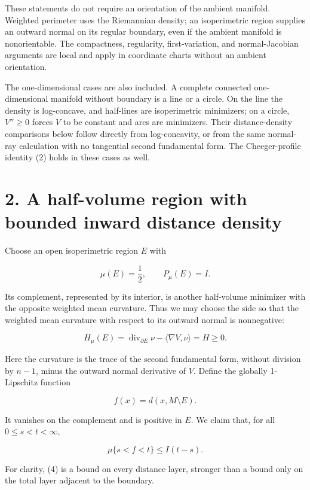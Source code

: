 \documentclass[11pt,a4paper]{article}
\begin{document}
These statements do not require an orientation of the ambient manifold.
Weighted perimeter uses the Riemannian density; an isoperimetric region
supplies an outward normal on its regular boundary, even if the ambient
manifold is nonorientable. The compactness, regularity, first-variation,
and normal-Jacobian arguments are local and apply in coordinate charts
without an ambient orientation.

The one-dimensional cases are also included. A complete connected
one-dimensional manifold without boundary is a line or a circle. On the
line the density is log-concave, and half-lines are isoperimetric
minimizers; on a circle, \(V''\geq0\) forces \(V\) to be constant and
arcs are minimizers. Their distance-density comparisons below follow
directly from log-concavity, or from the same normal-ray calculation
with no tangential second fundamental form. The Cheeger-profile identity
(2) holds in these cases as well.

\hypertarget{1013-a-half-volume-region-with-bounded-inward-distance-density}{%
\section{2. A half-volume region with bounded inward distance
density}\label{1013-a-half-volume-region-with-bounded-inward-distance-density}}

Choose an open isoperimetric region \(E\) with

\[
\mu(E)=\frac12,
\qquad P_\mu(E)=I.
\]

Its complement, represented by its interior, is another half-volume
minimizer with the opposite weighted mean curvature. Thus we may choose
the side so that the weighted mean curvature with respect to its outward
normal is nonnegative:

\[
H_\mu(E)=\operatorname{div}_{\partial E}\nu-\langle\nabla V,\nu\rangle=H\geq0.
\]

Here the curvature is the trace of the second fundamental form, without
division by \(n-1\), minus the outward normal derivative of \(V\).
Define the globally 1-Lipschitz function

\[
f(x)=d(x,M\setminus E).
\tag{3}
\]

It vanishes on the complement and is positive in \(E\). We claim that,
for all \(0\leq s<t<\infty\),

\[
\mu\{s<f<t\}\leq I(t-s).
\tag{4}
\]

For clarity, (4) is a bound on every distance layer, stronger than a
bound only on the total layer adjacent to the boundary.
\end{document}
